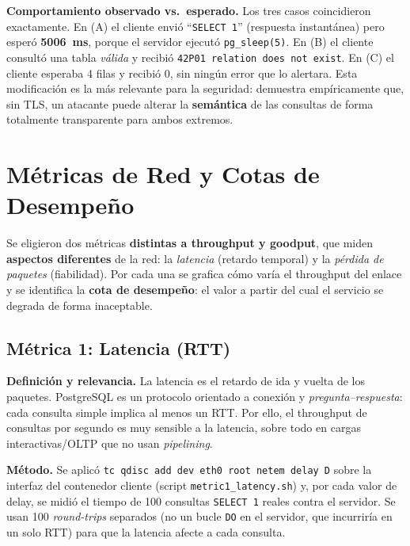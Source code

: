 \documentclass[11pt]{article}
\begin{document}
\textbf{Comportamiento observado vs.\ esperado.} Los tres casos coincidieron
exactamente. En (A) el cliente envió ``\texttt{SELECT 1}'' (respuesta
instantánea) pero esperó \textbf{5006~ms}, porque el servidor ejecutó
\texttt{pg\_sleep(5)}. En (B) el cliente consultó una tabla \emph{válida} y
recibió \texttt{42P01 relation does not exist}. En (C) el cliente esperaba 4
filas y recibió 0, sin ningún error que lo alertara. Esta modificación es la más
relevante para la seguridad: demuestra empíricamente que, sin TLS, un atacante
puede alterar la \textbf{semántica} de las consultas de forma totalmente
transparente para ambos extremos.

\section{Métricas de Red y Cotas de Desempeño}
\label{sec:metricas}

Se eligieron dos métricas \textbf{distintas a throughput y goodput}, que miden
\textbf{aspectos diferentes} de la red: la \emph{latencia} (retardo temporal) y
la \emph{pérdida de paquetes} (fiabilidad). Por cada una se grafica cómo varía
el throughput del enlace y se identifica la \textbf{cota de desempeño}: el valor
a partir del cual el servicio se degrada de forma inaceptable.

\subsection{Métrica 1: Latencia (RTT)}
\textbf{Definición y relevancia.} La latencia es el retardo de ida y vuelta de
los paquetes. PostgreSQL es un protocolo orientado a conexión y
\emph{pregunta--respuesta}: cada consulta simple implica al menos un RTT. Por
ello, el throughput de consultas por segundo es muy sensible a la latencia, sobre
todo en cargas interactivas/OLTP que no usan \emph{pipelining}.

\textbf{Método.} Se aplicó \texttt{tc qdisc add dev eth0 root netem delay D}
sobre la interfaz del contenedor cliente (script \texttt{metric1\_latency.sh}) y,
por cada valor de delay, se midió el tiempo de 100 consultas \texttt{SELECT 1}
reales contra el servidor. Se usan 100 \emph{round-trips} separados (no un bucle
\texttt{DO} en el servidor, que incurriría en un solo RTT) para que la latencia
afecte a cada consulta.
\end{document}
